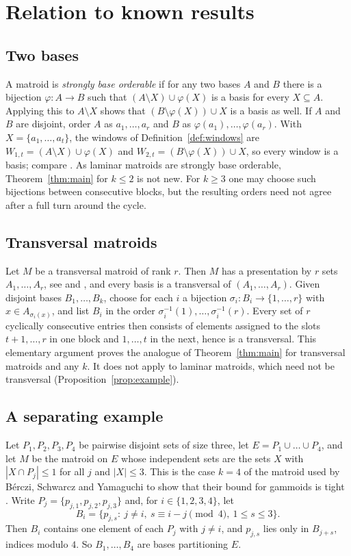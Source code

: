 \documentclass[11pt]{amsart}
\theoremstyle{definition}
\theoremstyle{remark}
\numberwithin{equation}{section}
\begin{document}
\section{Relation to known results}\label{sec:known}

\subsection{Two bases}\label{subsec:two}
A matroid is \emph{strongly base orderable} if for any two bases $A$ and $B$ there is a bijection $\varphi\colon A\to B$ such that $(A\setminus X)\cup\varphi(X)$ is a basis for every $X\subseteq A$. Applying this to $A\setminus X$ shows that $(B\setminus\varphi(X))\cup X$ is a basis as well. If $A$ and $B$ are disjoint, order $A$ as $a_1,\dots,a_r$ and $B$ as $\varphi(a_1),\dots,\varphi(a_r)$. With $X=\{a_1,\dots,a_t\}$, the windows of Definition~\ref{def:windows} are $W_{1,t}=(A\setminus X)\cup\varphi(X)$ and $W_{2,t}=(B\setminus\varphi(X))\cup X$, so every window is a basis; compare \cite[Section~1]{BJM}. As laminar matroids are strongly base orderable, Theorem~\ref{thm:main} for $k\le 2$ is not new. For $k\ge3$ one may choose such bijections between consecutive blocks, but the resulting orders need not agree after a full turn around the cycle.

\subsection{Transversal matroids}\label{subsec:transversal}
Let $M$ be a transversal matroid of rank $r$. Then $M$ has a presentation by $r$ sets $A_1,\dots,A_r$, see \cite[Section~1.6]{Oxley} and \cite[Section~3.1]{BSY}, and every basis is a transversal of $(A_1,\dots,A_r)$. Given disjoint bases $B_1,\dots,B_k$, choose for each $i$ a bijection $\sigma_i\colon B_i\to\{1,\dots,r\}$ with $x\in A_{\sigma_i(x)}$, and list $B_i$ in the order $\sigma_i^{-1}(1),\dots,\sigma_i^{-1}(r)$. Every set of $r$ cyclically consecutive entries then consists of elements assigned to the slots $t+1,\dots,r$ in one block and $1,\dots,t$ in the next, hence is a transversal. This elementary argument proves the analogue of Theorem~\ref{thm:main} for transversal matroids and any $k$. It does not apply to laminar matroids, which need not be transversal (Proposition~\ref{prop:example}).

\subsection{A separating example}\label{subsec:example}
Let $P_1,P_2,P_3,P_4$ be pairwise disjoint sets of size three, let $E=P_1\cup\dots\cup P_4$, and let $M$ be the matroid on $E$ whose independent sets are the sets $X$ with $|X\cap P_j|\le1$ for all $j$ and $|X|\le3$. This is the case $k=4$ of the matroid used by B\'erczi, Schwarcz and Yamaguchi to show that their bound for gammoids is tight \cite[proof of Theorem~1.10]{BSY}. Write $P_j=\{p_{j,1},p_{j,2},p_{j,3}\}$ and, for $i\in\{1,2,3,4\}$, let
\[
B_i=\{p_{j,s}:\ j\ne i,\ s\equiv i-j\pmod 4,\ 1\le s\le3\}.
\]
Then $B_i$ contains one element of each $P_j$ with $j\ne i$, and $p_{j,s}$ lies only in $B_{j+s}$, indices modulo $4$. So $B_1,\dots,B_4$ are bases partitioning $E$.
\end{document}
